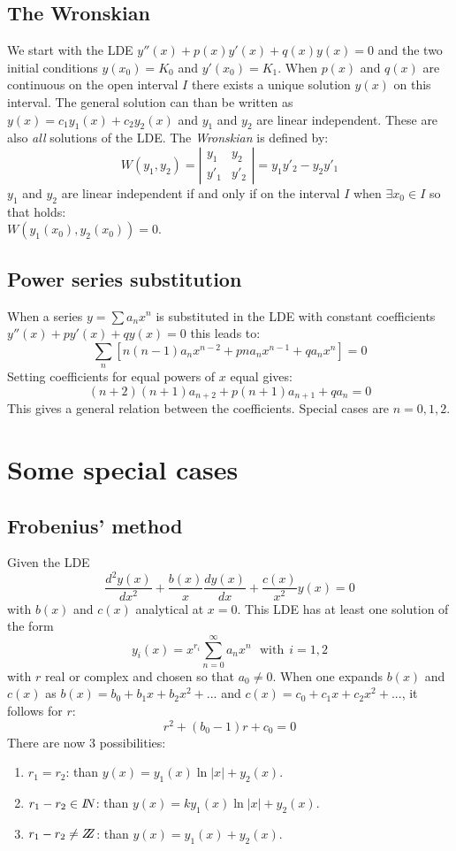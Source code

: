 \documentclass[a4paper,fancyheadings,twoside]{report}
\begin{document}
\subsection{The Wronskian}
We start with the LDE $y''(x)+p(x)y'(x)+q(x)y(x)=0$ and the two initial conditions
$y(x_0)=K_0$ and $y'(x_0)=K_1$. When $p(x)$ and $q(x)$ are continuous on the open
interval $I$ there exists a unique solution $y(x)$ on this interval.
\npar
The general solution can than be written as $y(x)=c_1y_1(x)+c_2y_2(x)$ and
$y_1$ and $y_2$ are linear independent. These are also {\it all} solutions of
the LDE.
\npar
The {\it Wronskian} is defined by:
\[
W(y_1,y_2)=
\left|\begin{array}{cc}
y_1&y_2\\
y'_1&y'_2
\end{array}\right|=y_1y'_2-y_2y'_1
\]
$y_1$ and $y_2$ are linear independent if and only if on the interval
$I$ when $\exists x_0\in I$ so that holds:\\
$W(y_1(x_0),y_2(x_0))=0$.

\subsection{Power series substitution}
When a series $y=\sum a_nx^n$ is substituted in the LDE with constant
coefficients $y''(x)+py'(x)+qy(x)=0$ this leads to:
\[
\sum_n\left[n(n-1)a_nx^{n-2}+pna_nx^{n-1}+qa_nx^n\right]=0
\]
Setting coefficients for equal powers of $x$ equal gives:
\[
(n+2)(n+1)a_{n+2}+p(n+1)a_{n+1}+qa_n=0
\]
This gives a general relation between the coefficients. Special cases are
$n=0,1,2$.

\section{Some special cases}
\subsection{Frobenius' method}
Given the LDE
\[
\frac{d^2y(x)}{dx^2}+\frac{b(x)}{x}\frac{dy(x)}{dx}+\frac{c(x)}{x^2}y(x)=0
\]
with $b(x)$ and $c(x)$ analytical at $x=0$. This LDE has at least one solution
of the form
\[
y_i(x)=x^{r_i}\sum_{n=0}^\infty a_nx^n~~~\mbox{with}~~i=1,2
\]
with $r$ real or complex and chosen so that $a_0\neq0$. When one expands $b(x)$
and $c(x)$ as $b(x)=b_0+b_1x+b_2x^2+...$ and $c(x)=c_0+c_1x+c_2x^2+...$, it
follows for $r$:
\[
r^2+(b_0-1)r+c_0=0
\]
There are now 3 possibilities:
\begin{enumerate}
\item $r_1=r_2$: than $y(x)=y_1(x)\ln|x|+y_2(x)$.
\item $r_1-r_2\in I\hspace{-1mm}N$: than $y(x)=ky_1(x)\ln|x|+y_2(x)$.
\item $r_1-r_2\neq Z\hspace{-1ex}Z$: than $y(x)=y_1(x)+y_2(x)$.
\end{enumerate}
\end{document}
